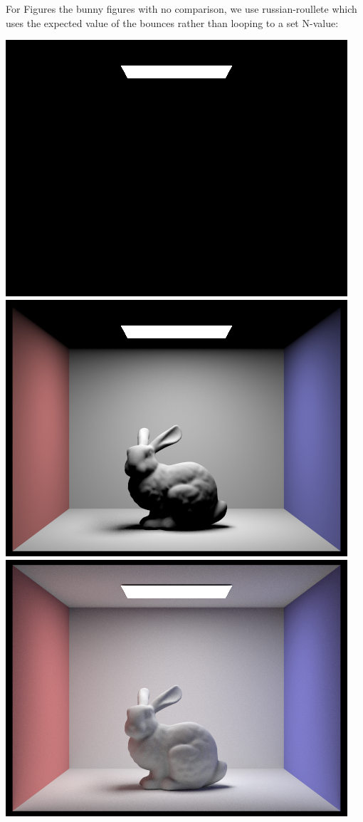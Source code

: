 \documentclass{article}
\begin{document}
\\
\\
For Figures the  bunny figures with no comparison, we use russian-roullete which uses the expected value of the bounces rather than looping to a set N-value:
\begin{center}
    \includegraphics[width=\textwidth]{task4/CBbunny_global_1024_0.png}
    \includegraphics[width=\textwidth]{task4/CBbunny_global_1024_1.png}
    \includegraphics[width=\textwidth]{task4/CBbunny_global_1024_2.png}

\end{center}
\end{document}
